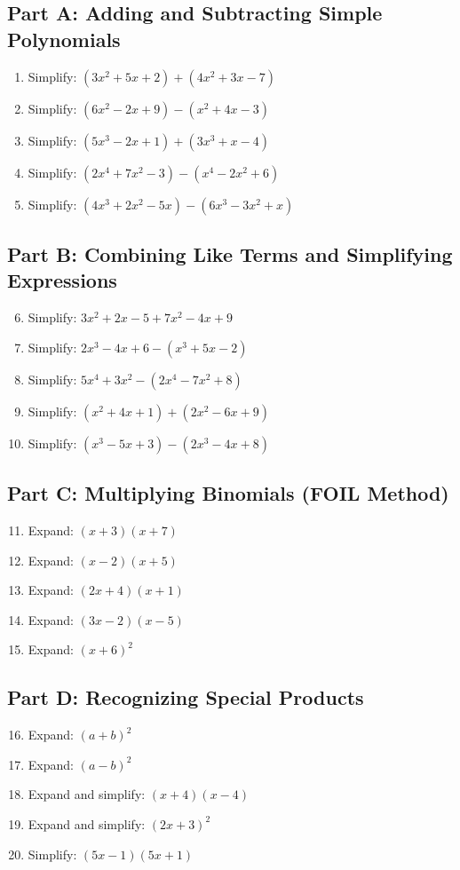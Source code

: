 \documentclass[12pt]{article}
\begin{document}
\subsection*{Part A: Adding and Subtracting Simple Polynomials}
\begin{enumerate}
  \item Simplify: \((3x^2 + 5x + 2) + (4x^2 + 3x - 7)\)
  \item Simplify: \((6x^2 - 2x + 9) - (x^2 + 4x - 3)\)
  \item Simplify: \((5x^3 - 2x + 1) + (3x^3 + x - 4)\)
  \item Simplify: \((2x^4 + 7x^2 - 3) - (x^4 - 2x^2 + 6)\)
  \item Simplify: \((4x^3 + 2x^2 - 5x) - (6x^3 - 3x^2 + x)\)
\end{enumerate}

\subsection*{Part B: Combining Like Terms and Simplifying Expressions}
\begin{enumerate}
  \setcounter{enumi}{5}
  \item Simplify: \(3x^2 + 2x - 5 + 7x^2 - 4x + 9\)
  \item Simplify: \(2x^3 - 4x + 6 - (x^3 + 5x - 2)\)
  \item Simplify: \(5x^4 + 3x^2 - (2x^4 - 7x^2 + 8)\)
  \item Simplify: \((x^2 + 4x + 1) + (2x^2 - 6x + 9)\)
  \item Simplify: \((x^3 - 5x + 3) - (2x^3 - 4x + 8)\)
\end{enumerate}

\subsection*{Part C: Multiplying Binomials (FOIL Method)}
\begin{enumerate}
  \setcounter{enumi}{10}
  \item Expand: \((x + 3)(x + 7)\)
  \item Expand: \((x - 2)(x + 5)\)
  \item Expand: \((2x + 4)(x + 1)\)
  \item Expand: \((3x - 2)(x - 5)\)
  \item Expand: \((x + 6)^2\)
\end{enumerate}

\subsection*{Part D: Recognizing Special Products}
\begin{enumerate}
  \setcounter{enumi}{15}
  \item Expand: \((a + b)^2\)
  \item Expand: \((a - b)^2\)
  \item Expand and simplify: \((x + 4)(x - 4)\)
  \item Expand and simplify: \((2x + 3)^2\)
  \item Simplify: \((5x - 1)(5x + 1)\)
\end{enumerate}
\end{document}
